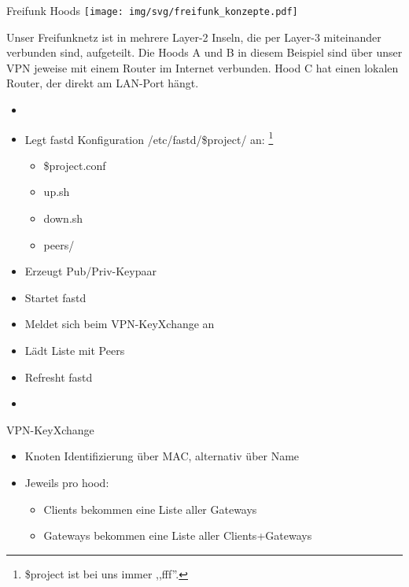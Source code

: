 \begin{frame}{Freifunk Hoods}
    \texttt{[image: img/svg/freifunk\_konzepte.pdf]}

    Unser Freifunknetz ist in mehrere Layer-2 Inseln, die per Layer-3 miteinander verbunden sind,
    aufgeteilt. Die Hoods A und B in diesem Beispiel sind über unser VPN jeweise mit einem Router im
    Internet verbunden. Hood C hat einen lokalen Router, der direkt am LAN-Port hängt.
\end{frame}

\begin{frame}{}
    \begin{itemize}
        \item {}
        \item Legt fastd Konfiguration
            /etc/fastd/\$project/  an:
            \footnote{\$project ist bei uns immer ,,fff''.}
            \begin{itemize}
                \item \$project.conf
                \item up.sh
                \item down.sh
                \item peers/
            \end{itemize}
        \item Erzeugt Pub/Priv-Keypaar
        \item Startet fastd
        \item Meldet sich beim VPN-KeyXchange an
        \item Lädt Liste mit Peers
        \item Refresht fastd
        \item {}
    \end{itemize}
\end{frame}

\begin{frame}{VPN-KeyXchange}
    \begin{itemize}
        \item Knoten Identifizierung über MAC, alternativ über Name
        \item Jeweils pro hood:
        \begin{itemize}
            \item Clients bekommen eine Liste aller Gateways
            \item Gateways bekommen eine Liste aller Clients+Gateways
        \end{itemize}
    \end{itemize}
\end{frame}
